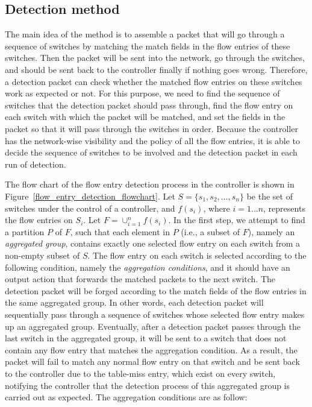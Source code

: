 \subsection{Detection method}
\label{Detection_method}
The main idea of the method is to assemble a packet that will go through a sequence of switches by matching the match fields in the flow entries of these switches. Then the packet will be sent into the network, go through the switches, and should be sent back to the controller finally if nothing goes wrong. Therefore, a detection packet can check whether the matched flow entries on these switches work as expected or not. For this purpose, we need to find the sequence of switches that the detection packet should pass through, find the flow entry on each switch with which the packet will be matched, and set the fields in the packet so that it will pass through the switches in order. Because the controller has the network-wise visibility and the policy of all the flow entries, it is able to decide the sequence of switches to be involved and the detection packet in each run of detection.

The flow chart of the flow entry detection process in the controller is shown in Figure~\ref{flow_entry_detection_flowchart}. Let $S=\{s_1,s_2,\ldots,s_n\}$ be the set of switches under the control of a controller, and $f(s_i)$, where $i=1\ldots n$, represents the flow entries on $S_i$. Let $F=\cup_{i=1}^n f(s_i)$. In the first step, we attempt to find a partition $P$ of $F$, such that each element in $P$ (i.e., a subset of $F$), namely an \textit{aggregated group}, contains exactly one selected flow entry on each switch from a non-empty subset of $S$. The flow entry on each switch is selected according to the following condition, namely the \textit{aggregation conditions}, and it should have an output action that forwards the matched packets to the next switch. The detection packet will be forged according to the match fields of the flow entries in the same aggregated group. In other words, each detection packet will sequentially pass through a sequence of switches whose selected flow entry makes up an aggregated group. Eventually, after a detection packet passes through the last switch in the aggregated group, it will be sent to a switch that does not contain any flow entry that matches the aggregation condition. As a result, the packet will fail to match any normal flow entry on that switch and be sent back to the controller due to the table-miss entry, which exist on every switch, notifying the controller that the detection process of this aggregated group is carried out as expected. The aggregation conditions are as follow:

